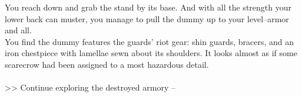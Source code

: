 You reach down and grab the stand by its base. And with all the strength your lower back can muster, you manage to pull the dummy up to your level--armor and all.\\

You find the dummy features the guards’ riot gear: shin guards, bracers, and an iron chestpiece with lamellae sewn about its shoulders. It looks almost as if some scarecrow had been assigned to a most hazardous detail.\\
\\

>> Continue exploring the destroyed armory -- 